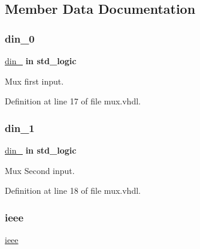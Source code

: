 \subsection{Member Data Documentation}
\mbox{\label{classmux__using__with_a6b6ddbcf5e151609729ea3dc550a0602}} 
\subsubsection{\texorpdfstring{din\_0}{din\_0}}
{\footnotesize\ttfamily \mbox{\hyperlink{classmux__using__with_a6b6ddbcf5e151609729ea3dc550a0602}{din\+\_}} {\bfseries \textcolor{keywordflow}{in}\textcolor{vhdlchar}{ }} {\bfseries \textcolor{keywordtype}{std\+\_\+logic}\textcolor{vhdlchar}{ }} \hspace{0.3cm}{\ttfamily [Port]}}



Mux first input. 



Definition at line 17 of file mux.\+vhdl.

\mbox{\label{classmux__using__with_ac132057a1a8271508f59556da8a85fb0}} 
\subsubsection{\texorpdfstring{din\_1}{din\_1}}
{\footnotesize\ttfamily \mbox{\hyperlink{classmux__using__with_ac132057a1a8271508f59556da8a85fb0}{din\+\_}} {\bfseries \textcolor{keywordflow}{in}\textcolor{vhdlchar}{ }} {\bfseries \textcolor{keywordtype}{std\+\_\+logic}\textcolor{vhdlchar}{ }} \hspace{0.3cm}{\ttfamily [Port]}}



Mux Second input. 



Definition at line 18 of file mux.\+vhdl.

\mbox{\label{classmux__using__with_a44d1d60c58066d98a072e90b31c9d908}} 
\subsubsection{\texorpdfstring{ieee}{ieee}}
{\footnotesize\ttfamily \mbox{\hyperlink{classmux__using__with_a44d1d60c58066d98a072e90b31c9d908}{ieee}}\hspace{0.3cm}{\ttfamily [Library]}}



